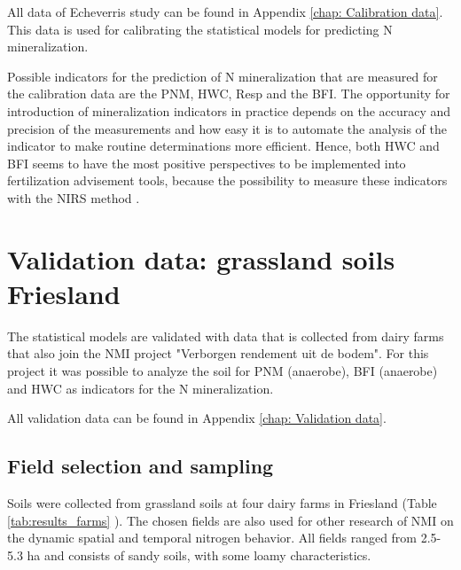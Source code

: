 \documentclass[10pt,twoside,dutch,english]{report}
\begin{document}
All data of Echeverris study can be found in Appendix \autoref{chap: Calibration data}. This data is used for calibrating the statistical models for predicting N mineralization.  

Possible indicators for the prediction of N mineralization that are measured for the calibration data are the PNM, HWC, Resp and the BFI. The opportunity for introduction of mineralization indicators in practice depends on the accuracy and precision of the measurements and how easy it is to automate the analysis of the indicator to make routine determinations more efficient. Hence, both HWC and BFI seems to have the most positive perspectives to be implemented into fertilization advisement tools, because the possibility to measure these indicators with the NIRS method \citep{Hanegraaf2008, Vasques2009}. 



\section{Validation data: grassland soils Friesland}
The statistical models are validated with data that is collected from dairy farms that also join the NMI project "Verborgen rendement uit de bodem". For this project it was possible to analyze the soil for PNM (anaerobe), BFI (anaerobe) and HWC   as indicators for the N mineralization. 

All validation data can be found in Appendix \autoref{chap: Validation data}.

\subsection{Field selection and sampling}
Soils were collected from grassland soils at four dairy farms in Friesland (Table \ref{tab:results_farms} ). The chosen fields are also used for other research of NMI on the dynamic spatial and temporal nitrogen behavior. All fields ranged from 2.5-5.3 ha and consists of sandy soils, with some loamy characteristics. %
\end{document}

